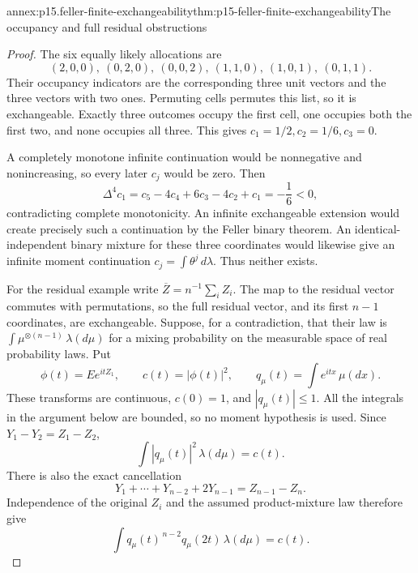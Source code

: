 \begin{annexitem}{annex:p15.feller-finite-exchangeability}{thm:p15-feller-finite-exchangeability}{The occupancy and full residual obstructions}
\begin{proof}
The six equally likely allocations are
\[
 (2,0,0),\ (0,2,0),\ (0,0,2),\
 (1,1,0),\ (1,0,1),\ (0,1,1).
\]
Their occupancy indicators are the corresponding three unit vectors
and the three vectors with two ones. Permuting cells permutes this
list, so it is exchangeable.
Exactly three outcomes occupy the first cell, one occupies both
the first two, and none occupies all three.
This gives \(c_1=1/2,c_2=1/6,c_3=0\).

A completely monotone infinite continuation would be nonnegative
and nonincreasing, so every later \(c_j\) would be zero.
Then
\[
               \Delta^4c_1=c_5-4c_4+6c_3-4c_2+c_1
                                         =-\frac16<0,
\]
contradicting complete monotonicity.
An infinite exchangeable extension would create precisely such a
continuation by the Feller binary theorem.
An identical-independent binary mixture for these three coordinates
would likewise give an infinite moment continuation
\(c_j=\int\theta^j\,d\lambda\).
Thus neither exists.

For the residual example write \(\overline Z=n^{-1}\sum_i Z_i\).
The map to the residual vector commutes with permutations, so the
full residual vector, and its first \(n-1\) coordinates, are exchangeable.
Suppose, for a contradiction, that their law is
\(\int\mu^{\otimes(n-1)}\,\lambda(d\mu)\) for a mixing probability
on the measurable space of real probability laws.
Put
\[
 \phi(t)=E e^{itZ_1},\qquad c(t)=|\phi(t)|^2,\qquad
 q_\mu(t)=\int e^{itx}\,\mu(dx).
\]
These transforms are continuous, \(c(0)=1\), and \(|q_\mu(t)|\leq1\).
All the integrals in the argument below are bounded, so no moment
hypothesis is used.
Since \(Y_1-Y_2=Z_1-Z_2\),
\[
                         \int|q_\mu(t)|^2\,\lambda(d\mu)=c(t).
\]
There is also the exact cancellation
\[
                  Y_1+\cdots+Y_{n-2}+2Y_{n-1}=Z_{n-1}-Z_n.
\]
Independence of the original \(Z_i\) and the assumed product-mixture
law therefore give
\[
                \int q_\mu(t)^{\,n-2}q_\mu(2t)\,\lambda(d\mu)=c(t).
                                                        \tag{*}
\]


\end{proof}
\end{annexitem}
